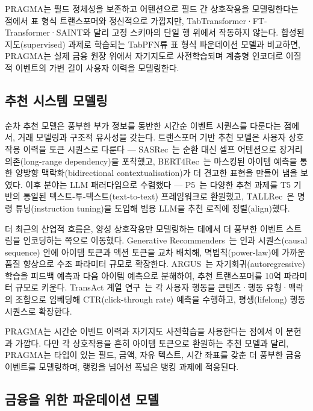 PRAGMA는 필드 정체성을 보존하고 어텐션으로 필드 간 상호작용을 모델링한다는 점에서 표 형식 트랜스포머와 정신적으로 가깝지만, TabTransformer·FT-Transformer·SAINT와 달리 고정 스키마의 단일 행 위에서 작동하지 않는다.
합성된 지도(supervised) 과제로 학습되는 TabPFN류 표 형식 파운데이션 모델과 비교하면, PRAGMA는 실제 금융 원장 위에서 자기지도로 사전학습되며 계층형 인코더로 이질적 이벤트의 가변 길이 사용자 이력을 모델링한다.

\subsection{추천 시스템 모델링}
\label{sec:rw-recsys}

순차 추천 모델은 풍부한 부가 정보를 동반한 시간순 이벤트 시퀀스를 다룬다는 점에서, 거래 모델링과 구조적 유사성을 갖는다.
트랜스포머 기반 추천 모델은 사용자 상호작용 이력을 토큰 시퀀스로 다룬다 — SASRec~\citep{kang2018self}는 순환 대신 셀프 어텐션으로 장거리 의존(long-range dependency)을 포착했고, BERT4Rec~\citep{sun2019bert4rec}는 마스킹된 아이템 예측을 통한 양방향 맥락화(bidirectional contextualisation)가 더 견고한 표현을 만들어 냄을 보였다.
이후 분야는 LLM 패러다임으로 수렴했다 — P5~\citep{geng2022recommendation}는 다양한 추천 과제를 T5 기반의 통일된 텍스트-투-텍스트(text-to-text) 프레임워크로 환원했고, TALLRec~\citep{bao2023tallrec}은 명령 튜닝(instruction tuning)을 도입해 범용 LLM을 추천 로직에 정렬(align)했다.

더 최근의 산업적 흐름은, 양성 상호작용만 모델링하는 데에서 더 풍부한 이벤트 스트림을 인코딩하는 쪽으로 이동했다.
Generative Recommenders~\citep{zhai2024actions}는 인과 시퀀스(causal sequence) 안에 아이템 토큰과 액션 토큰을 교차 배치해, 멱법칙(power-law)에 가까운 품질 향상으로 수조 파라미터 규모로 확장한다.
ARGUS~\citep{khrylchenko2025scaling}는 자기회귀(autoregressive) 학습을 피드백 예측과 다음 아이템 예측으로 분해하여, 추천 트랜스포머를 10억 파라미터 규모로 키운다.
TransAct 계열 연구~\citep{xia2023transact,xia2025transact}는 각 사용자 행동을 콘텐츠·행동 유형·맥락의 조합으로 임베딩해 CTR(click-through rate) 예측을 수행하고, 평생(lifelong) 행동 시퀀스로 확장한다.

PRAGMA는 시간순 이벤트 이력과 자기지도 사전학습을 사용한다는 점에서 이 문헌과 가깝다.
다만 각 상호작용을 흔히 아이템 토큰으로 환원하는 추천 모델과 달리, PRAGMA는 타입이 있는 필드, 금액, 자유 텍스트, 시간 좌표를 갖춘 더 풍부한 금융 이벤트를 모델링하며, 랭킹을 넘어선 폭넓은 뱅킹 과제에 적응된다.

\subsection{금융을 위한 파운데이션 모델}
\label{sec:rw-finance}

